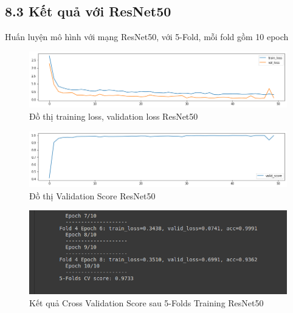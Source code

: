 \documentclass{article}
\begin{document}
	\subsection{8.3 Kết quả với ResNet50}
	Huấn luyện mô hình với mạng ResNet50, với 5-Fold, mỗi fold gồm 10 epoch
	\begin{figure}[H]
		\centering
		\includegraphics[width=1\linewidth]{results/resnet50/training_loss_results.png}
		\caption{Đồ thị training loss, validation loss ResNet50}
		\label{fig:writing-thesis}
	\end{figure}
	\begin{figure}[H]
		\centering
		\includegraphics[width=1\linewidth]{results/resnet50/valid_score_results.png}
		\caption{Đồ thị Validation Score ResNet50}
		\label{fig:writing-thesis}
	\end{figure}
	\begin{figure}[H]
		\centering
		\includegraphics[width=1\linewidth]{results/resnet50/CV_Score_5_Folds_ResNet50.png}
		\caption{Kết quả Cross Validation Score sau 5-Folds Training ResNet50}
		\label{fig:writing-thesis}
	\end{figure}
\end{document}
